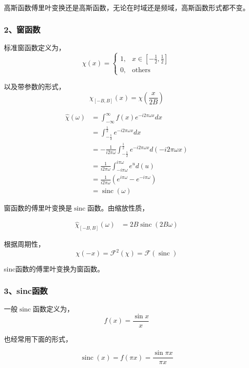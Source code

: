 		高斯函数傅里叶变换还是高斯函数，无论在时域还是频域，高斯函数形式都不变。
	\subsubsection*{2、窗函数}

		标准窗函数定义为，
		$$
			\chi(x) = 
			\begin{cases}
				1,& x \in [-\frac{1}{2},\frac{1}{2}]\\
				0,& \text{others}
			\end{cases}
		$$

		以及带参数的形式，
		\begin{equation}\label{rect_pram_trans}
			\chi_{[-B,B]}(x) = \chi(\frac{x}{2B})
		\end{equation}

		\begin{align*}
			\hat{\chi}(\omega) 
				& = \int_{-\infty}^{\infty} f(x) e^{-i2\pi\omega x}dx\\
				& = \int_{-\frac{1}{2}}^{\frac{1}{2}} e^{-i2\pi\omega x}dx\\
				& = -\frac{1}{i2\pi\omega}
					\int_{-\frac{1}{2}}^{\frac{1}{2}} e^{-i2\pi\omega x}d(-i2\pi\omega x)\\
				& = \frac{1}{i2\pi\omega}\int_{-i\pi\omega}^{i\pi\omega} e^{u}d(u)\\
				&= \frac{1}{i2\pi\omega}\left(e^{i\pi\omega} - e^{-i\pi\omega}\right)\\
				&=\mathop{sinc}(\omega)
		\end{align*}

		窗函数的傅里叶变换是$\mathop{sinc}$函数。由缩放性质，

		\begin{align*}
			\hat{\chi}_{[-B,B]}(\omega) &= 2B\mathop{sinc}(2B\omega)
		\end{align*}

		根据周期性，
		$$
			\chi(-x) =\mathcal{F}^2(\chi) = \mathcal{F}(\mathop{sinc}) 
		$$
		
		sinc函数的傅里叶变换为窗函数。

	\subsubsection*{3、sinc函数}

		一般$\mathop{sinc}$函数定义为，
		$$
			f(x) =\frac{\sin x}{x}
		$$

		也经常用下面的形式，

		$$
			\mathop{sinc}(x) =f(\pi x) = \frac{\sin \pi x}{\pi x}
		$$

